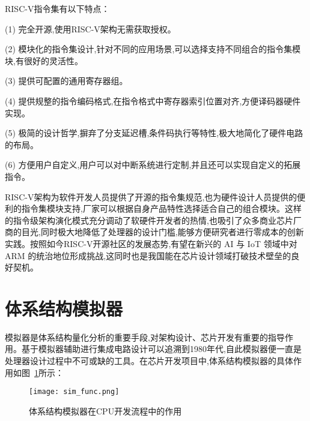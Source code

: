 RISC-V指令集有以下特点：


(1) 完全开源,使用RISC-V架构无需获取授权。


(2) 模块化的指令集设计,针对不同的应用场景,可以选择支持不同组合的指令集模块,有很好的灵活性。


(3) 提供可配置的通用寄存器组。


(4) 提供规整的指令编码格式,在指令格式中寄存器索引位置对齐,方便译码器硬件实现。


(5) 极简的设计哲学,摒弃了分支延迟槽,条件码执行等特性,极大地简化了硬件电路的布局。


(6) 方便用户自定义,用户可以对中断系统进行定制,并且还可以实现自定义的拓展指令。





















RISC-V架构为软件开发人员提供了开源的指令集规范,也为硬件设计人员提供的便利的指令集模块支持,厂家可以根据自身产品特性选择适合自己的组合模块。这样的指令级架构演化模式充分调动了软硬件开发者的热情,也吸引了众多商业芯片厂商的目光,同时极大地降低了处理器的设计门槛,能够方便研究者进行零成本的创新实践。按照如今RISC-V开源社区的发展态势,有望在新兴的 AI 与 IoT 领域中对ARM 的统治地位形成挑战\cite{邓紫珊2020基于},这同时也是我国能在芯片设计领域打破技术壁垒的良好契机。
\section{体系结构模拟器}
模拟器是体系结构量化分析的重要手段,对架构设计、芯片开发有重要的指导作用。基于模拟器辅助进行集成电路设计可以追溯到1980年代\cite{mukherjee2002performance},自此模拟器便一直是处理器设计过程中不可或缺的工具。在芯片开发项目中,体系结构模拟器的具体作用如图~\ref{fig:sim-func}所示：
\begin{figure}[h]
  \centering
  \texttt{[image: sim\_func.png]}
  \caption{体系结构模拟器在CPU开发流程中的作用}
  \label{fig:sim-func}
\end{figure}


